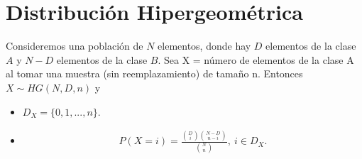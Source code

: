 \section{Distribución Hipergeométrica}

\begin{defi}
Consideremos una población de $N$ elementos, donde hay $D$ elementos de la clase $A$ y $N - D$ elementos de la clase $B$. Sea X = número de elementos de la clase A al tomar una muestra (sin reemplazamiento) de tamaño n. Entonces $X \sim HG(N,D,n)$ y
\begin{itemize}
    \item $D_X = \{0,1,...,n\}$.
    \item 
    \begin{align*}
        P(X = i) = \frac{\binom{D}{i}\binom{N - D}{n - i}}{\binom{N}{n}}, \ i \in D_X.
    \end{align*}
\end{itemize}
\end{defi}

